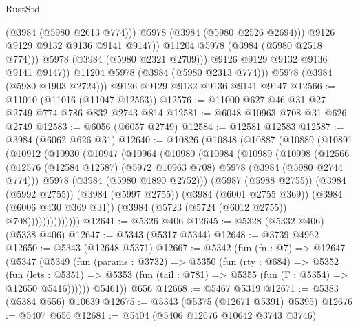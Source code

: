 \begin{lexlean}{RustStd}
\begin{coremodule}
                        (@3984 (@5980 @2613 @774)))
                      @5978
                      (@3984 (@5980 @2526 @2694)))
                    @9126
                    @9129
                    @9132
                    @9136
                    @9141
                    @9147))
                @11204
                @5978
                (@3984 (@5980 @2518 @774)))
              @5978
              (@3984 (@5980 @2321 @2709)))
            @9126
            @9129
            @9132
            @9136
            @9141
            @9147))
        @11204
        @5978
        (@3984 (@5980 @2313 @774)))
      @5978
      (@3984 (@5980 @1903 @2724)))
    @9126
    @9129
    @9132
    @9136
    @9141
    @9147
@12566 := @11010 (@11016 (@11047 @12563))
@12576 := @11000 @627 @46 @31 @27 @2749 @774 @786 @832 @2743 @814
@12581 := @6048 @10963 @708 @31 @626 @2749
@12583 := @6056 (@6057 @2749)
@12584 := @12581 @12583
@12587 := @3984 (@6062 @626 @31)
@12640 := @10826
    (@10848
      (@10887
        (@10889
          (@10891
            (@10912
              (@10930
                (@10947
                  (@10964
                    (@10980
                      (@10984
                        (@10989
                          (@10998
                            (@12566
                              (@12576
                                (@12584 @12587)
                                (@5972 @10963 @708)
                                @5978
                                (@3984 (@5980 @2744 @774)))
                              @5978
                              (@3984 (@5980 @1890 @2752)))
                            (@5987 (@5988 @2755))
                            (@3984 (@5992 @2755))
                            (@3984 (@5997 @2755))
                            (@3984 (@6001 @2755 @369))
                            (@3984 (@6006 @430 @369 @31))
                            (@3984 (@5723 (@5724 (@6012 @2755)) @708))))))))))))))
@12641 := @5326 @406
@12645 := @5328 (@5332 @406) (@5338 @406)
@12647 := @5343 (@5317 @5344)
@12648 := @3739 @4962
@12650 := @5343 (@12648 @5371)
@12667 := @5342
    (fun (fn : @7) =>
    @12647
      (@5347
        (@5349
          (fun (params : @3732) =>
          @5350
            (fun (rty : @684) =>
            @5352
              (fun (lets : @5351) =>
              @5353 (fun (tail : @781) => @5355 (fun (Γ : @5354) => @12650 @5416))))))
        @5461))
    @656
@12668 := @5467 @5319
@12671 := @5383 (@5384 @656) @10639
@12675 := @5343 (@5375 (@12671 @5391) @5395)
@12676 := @5407 @656
@12681 := @5404 (@5406 @12676 @10642 @3743 @3746)

\end{coremodule}
\end{lexlean}
